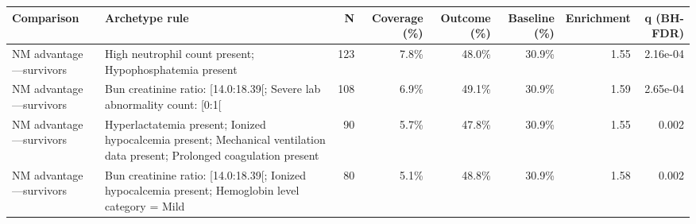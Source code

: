 \documentclass[border=0pt]{standalone}
\begin{document}
\begin{adjustbox}{width=\textwidth}
\begin{tabular}{@{}llrrrrrr@{}}
\toprule
Comparison & Archetype rule & N & Coverage (\%) & Outcome (\%) & Baseline (\%) & Enrichment & q (BH-FDR) \\
\midrule
NM advantage—survivors & High neutrophil count present; Hypophosphatemia present & 123 & 7.8\% & 48.0\% & 30.9\% & 1.55 & 2.16e-04 \\
NM advantage—survivors & Bun creatinine ratio: [14.0:18.39[; Severe lab abnormality count: [0:1[ & 108 & 6.9\% & 49.1\% & 30.9\% & 1.59 & 2.65e-04 \\
NM advantage—survivors & Hyperlactatemia present; Ionized hypocalcemia present; Mechanical ventilation data present; Prolonged coagulation present & 90 & 5.7\% & 47.8\% & 30.9\% & 1.55 & 0.002 \\
NM advantage—survivors & Bun creatinine ratio: [14.0:18.39[; Ionized hypocalcemia present; Hemoglobin level category = Mild & 80 & 5.1\% & 48.8\% & 30.9\% & 1.58 & 0.002 \\
\bottomrule
\end{tabular}
\end{adjustbox}
\end{document}
